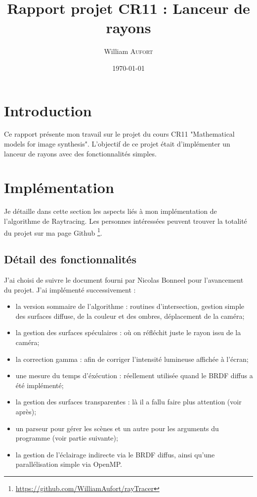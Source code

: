 \documentclass[a4paper,10pt]{article}
\title{Rapport projet CR11 : Lanceur de rayons}
\author{
    William \textsc{Aufort}
}
\date{\today}
\begin{document}
\maketitle

\section*{Introduction}

Ce rapport présente mon travail sur le projet du cours CR11 "Mathematical models for image synthesis". L'objectif de ce projet était d'implémenter un lanceur de rayons avec des fonctionnalités simples.

\tableofcontents

\section{Implémentation}

Je détaille dans cette section les aspects liés à mon implémentation de l'algorithme de Raytracing. Les personnes intéressées peuvent trouver la totalité du projet sur ma page Github \footnote{\url{https://github.com/WilliamAufort/rayTracer}}.

\subsection{Détail des fonctionnalités}

J'ai choisi de suivre le document fourni par Nicolas Bonneel pour l'avancement du projet. J'ai implémenté successivement :
\begin{itemize}
  \item la version sommaire de l'algorithme : routines d'intersection, gestion simple des surfaces diffuse, de la couleur et des ombres, déplacement de la caméra;
  \item la gestion des surfaces spéculaires : où on réfléchit juste le rayon issu de la caméra;
  \item la correction gamma : afin de corriger l'intensité lumineuse affichée à l'écran;
  \item une mesure du temps d'éxécution : réellement utilisée quand le BRDF diffus a été implémenté;
  \item la gestion des surfaces transparentes : là il a fallu faire plus attention (voir après);
  \item un parseur pour gérer les scènes et un autre pour les arguments du programme (voir partie suivante);
  \item la gestion de l'éclairage indirecte via le BRDF diffus, ainsi qu'une parallélisation simple via OpenMP.
\end{itemize}
\end{document}
